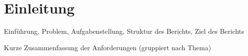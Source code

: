 \section{Einleitung}

Einführung, Problem, Aufgabenstellung, Struktur des Berichts, Ziel des Berichts

Kurze Zusammenfassung der Anforderungen (gruppiert nach Thema)
